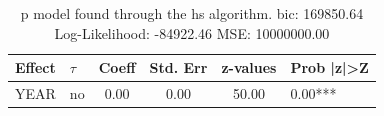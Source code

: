 \begin{table}
	\caption{p model found through the hs algorithm. bic: 169850.64 Log-Likelihood: -84922.46 MSE: 10000000.00}
	\begin{center}
		\begin{tabular}{|l|l|c|c|c|l|}
			\hline
			Effect & $\tau$ & Coeff & Std. Err & z-values & Prob |z|>Z \\
			\hline
			YEAR & no & 0.00 & 0.00 & 50.00 & 0.00*** \\
			\hline
		\end{tabular}
	\end{center}
\end{table}